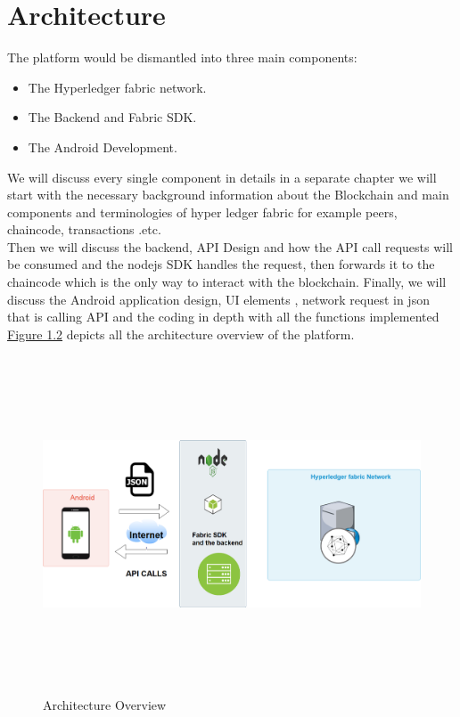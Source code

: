 \section{Architecture}
The platform would be dismantled into three main components: 
\begin{itemize}
  \item The Hyperledger fabric network.
  \item The Backend and Fabric SDK. 
  \item The Android Development. 
\end{itemize}

We will discuss every single component in details in a separate chapter we will start with the necessary background information about the Blockchain and main components and terminologies of hyper ledger fabric for example peers, chaincode, transactions .etc. \\ Then we will discuss the backend, API Design  and how the API call requests will be consumed and the nodejs SDK handles the request, then forwards it to the chaincode which is the only way to interact with the blockchain.
Finally, we will discuss the Android application design, UI elements , network request in json that is calling API and the coding in depth with all the functions implemented \hyperref[fig:architecture]{Figure 1.2} depicts all the architecture overview of the platform. 
\begin{figure}[H]
	\includegraphics[width=15cm,height=10cm]{images/architecture.png}
	\caption{Architecture Overview}
	\label{fig:architecture}
	\end{figure}

      

 


      